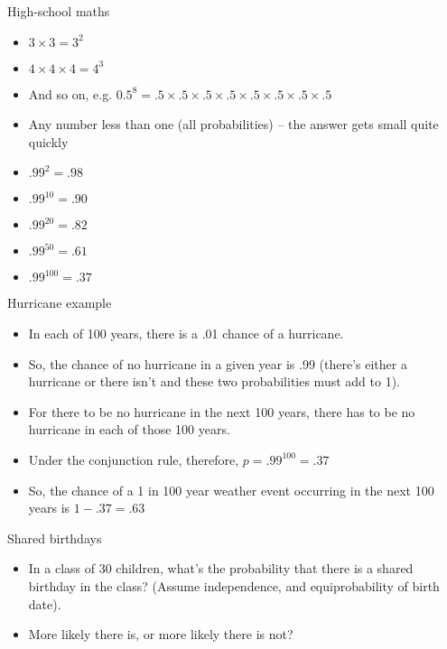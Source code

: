 \documentclass{beamer}
\begin{document}
\begin{frame}{High-school maths}
\begin{itemize}
\item $3 \times 3 = 3^2 $
\item $4 \times 4 \times 4 = 4^3$
\item And so on, e.g. $0.5^8 = .5 \times .5 \times .5 \times .5 \times .5 \times .5 \times .5 \times .5 $
\item Any number less than one (all probabilities) -- the answer gets small quite quickly
\item $.99^2 = .98$
\item $.99^{10} = .90$
\item $.99^{20} = .82$
\item $.99^{50} = .61$
\item $.99^{100} = .37$
\end{itemize}
\end{frame}

\begin{frame}{Hurricane example}
	\begin{itemize} 
		\item In each of 100 years, there is a .01 chance of a hurricane.
		\item So, the chance of no hurricane in a given year is .99 (there's either a hurricane or there isn't and these two probabilities must add to 1).
		\item For there to be no hurricane in the next 100 years, there has to be no hurricane in each of those 100 years.	
		\item Under the conjunction rule, therefore, $p = .99^{100} = .37$	
		\item So, the chance of a 1 in 100 year weather event occurring in the next 100 years is $1-.37=.63$
	\end{itemize}
\end{frame}

\begin{frame}{Shared birthdays}
	\begin{itemize} 
		\item In a class of 30 children, what's the probability that there is a shared birthday in the class? (Assume independence, and equiprobability of birth date).
		\item More likely there is, or more likely there is not?
	\end{itemize}
\end{frame}
\end{document}
